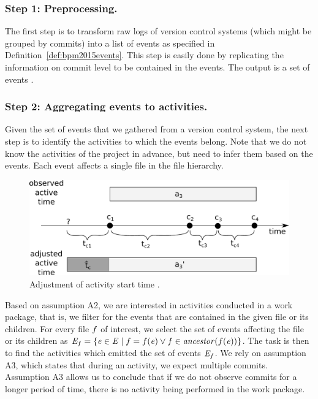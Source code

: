 \subsubsection{Step 1: Preprocessing.} The first step is to transform raw logs of version control systems (which might be grouped by commits) into a list of events as specified in Definition~\ref{def:bpm2015events}. This step is easily done by replicating the information on commit level to be contained in the events. The output is a set of events \Events.

\subsubsection{Step 2: Aggregating events to activities.}
Given the set of events \Events that we gathered from a version control system, the next step is to identify the activities to which the events belong. Note that we do not know the activities of the project in advance, but need to infer them based on the events. Each event affects a single file in the file hierarchy.

\begin{figure}
\centering
\includegraphics[width=.7\textwidth]{bpm2015/imgs/activity_adjustment}
\caption{Adjustment of activity start time \startTimeFunction. }
\label{fig:activity_adjustment}
\end{figure}

Based on assumption A2, we are interested in activities conducted in a work package, that is, we filter for the events that are contained in the given file or its children. For every file $f$ of interest, we select the set of events affecting the file or its children as $\mathit{E}_{f} = \lbrace \mathit{e} \in \mathit{E} \mid f = f(\mathit{e}) \vee f \in \mathit{ancestor}(f(\mathit{e}))  \rbrace$. The task is then to find the activities which emitted the set of events $\mathit{E}_{f}$. We rely on assumption A3, which states that during an activity, we expect multiple commits. Assumption A3 allows us to conclude that if we do not observe commits for a longer period of time, there is no activity being performed in the work package.

